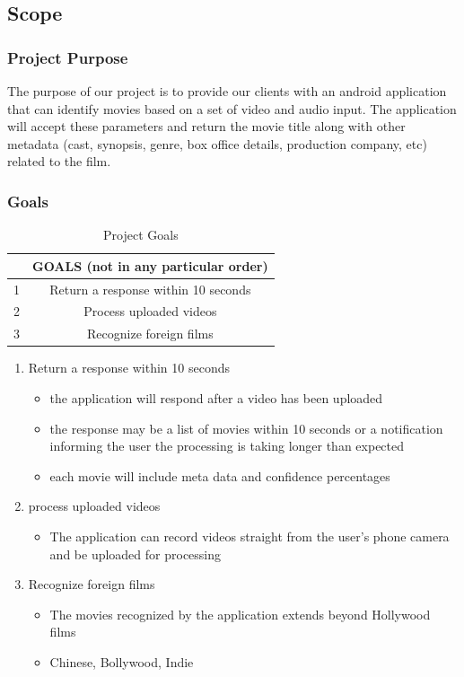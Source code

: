 \documentclass[titlepage]{article}
\begin{document}
\subsection{Scope}

\subsubsection{Project Purpose}
The purpose of our project is to provide our clients with an android application that can identify movies based on a set of video and audio input. The application will accept these parameters and return the movie title along with other metadata (cast, synopsis, genre, box office details, production company, etc) related to the film. 

\subsubsection{Goals}
\begin{table}[hbtp]
    \centering
    \begin{tabular}{|c|c|}
        \hline
         & GOALS (not in any particular order)\\
         \hline
         1 & Return a response within 10 seconds\\
         \hline
         2 & Process uploaded videos\\
         \hline
         3 & Recognize foreign films\\
         \hline
    \end{tabular}
    \caption{Project Goals}
\end{table}

\begin{enumerate}
    \item Return a response within 10 seconds
    \begin{itemize}
        \item the application will respond after a video has been uploaded
        \item the response may be a list of movies within 10 seconds or a notification informing the user the processing is taking longer than expected
        \item each movie will include meta data and confidence percentages
    \end{itemize}
    
    \item process uploaded videos
    \begin{itemize}
        \item The application can record videos straight from the user's phone camera and be uploaded for processing
    \end{itemize}
    
    \item Recognize foreign films
    \begin{itemize}
        \item The movies recognized by the application extends beyond Hollywood films
        \item Chinese, Bollywood, Indie
    \end{itemize}
\end{enumerate}
\end{document}
